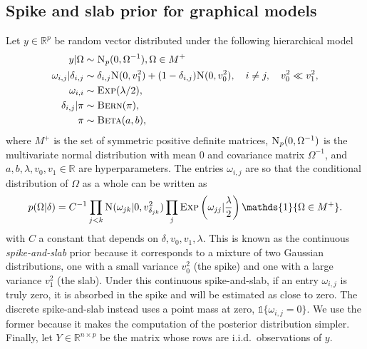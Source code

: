 \documentclass{scrartcl}
\newcommand{\R}{\mathbb{R}}
\newcommand{\1}{\mathds{1}}
\newcommand{\inv}{^{-1}}
\newcommand{\Np}{\textsc{N}_p}
\newcommand{\Nor}{\textsc{N}}
\newcommand{\Bern}{\textsc{Bern}}
\newcommand{\Beeta}{\textsc{Beta}}
\newcommand{\Exp}{\textsc{Exp}}
\begin{document}
\subsection{Spike and slab prior for graphical models}
Let $y \in \R^p$ be random vector distributed under the following hierarchical model
\begin{align*}
	y | \Omega                  & \sim \Np(0, \Omega\inv), \Omega \in M^+                                                                      \\
	\omega_{i,j} | \delta_{i,j} & \sim \delta_{i,j} \Nor(0, v_1^2) + (1 - \delta_{i,j}) \Nor(0, v_0^2), \quad i \neq j, \quad v_0^2 \ll v_1^2, \\
	\omega_{i,i}                & \sim \textsc{Exp}(\lambda / 2),                                                                              \\
	\delta_{i,j} | \pi          & \sim \Bern(\pi),                                                                                             \\
	\pi                         & \sim \Beeta(a,b),
\end{align*}
where $M^+$ is the set of symmetric positive definite matrices, $\Np(0, \Omega\inv)$ is the multivariate normal distribution with mean $0$ and
covariance matrix $\Omega\inv$, and $a, b, \lambda, v_0, v_1 \in \R$ are hyperparameters.
The entries $\omega_{i,j}$ are so that the conditional distribution of $\Omega$ as a whole can be written as
\[p(\Omega | \delta) = C\inv \prod_{j < k}  \Nor(\omega_{jk} | 0,
	v_{\delta_{jk}}^2) \prod_j \Exp\left(\omega_{jj} | \frac{\lambda}{2}\right) \1\{\Omega \in M^+ \}.\]
with $C$ a constant that depends on $\delta, v_0, v_1, \lambda$.
This is known as the continuous \emph{spike-and-slab} prior because it
corresponds to a mixture of two Gaussian distributions, one with a small variance
$v_0^2$ (the spike) and one with a large variance $v_1^2$ (the slab).
Under this continuous spike-and-slab, if an entry $\omega_{i,j}$ is truly zero,
it is absorbed in the spike and will be estimated as close to zero. The discrete spike-and-slab instead uses a point mass at zero, $\1\{\omega_{i,j} = 0\}.$ We use the former because it makes the computation of the
posterior distribution simpler.
Finally, let $Y \in \R^{n \times p}$ be the matrix whose rows are i.i.d.\
observations of $y$.
\end{document}
